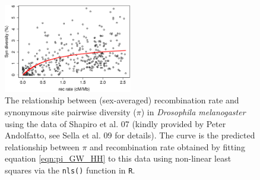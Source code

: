 \begin{figure}
\begin{center}
\includegraphics[width=0.5\textwidth]{figures/Genomewide_HH.eps}
\end{center}
\caption{The relationship between (sex-averaged) recombination rate and synonymous
  site pairwise diversity ($\pi$) in {\it Drosophila melanogaster}
  using the data of Shapiro et al. 07 (kindly provided by Peter
  Andolfatto, see Sella et al. 09 for details). The curve is the
  predicted relationship between $\pi$ and recombination rate obtained
  by fitting equation \eqref{eqn:pi_GW_HH} to this data 
 using non-linear least squares via the {\tt nls()} function in {\tt R}.} \label{fig:GW_hitchhiking_reduction}
\end{figure}



